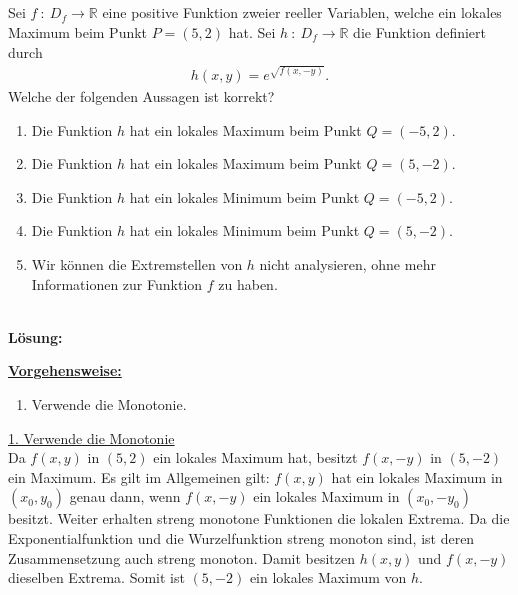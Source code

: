 \subsection*{}
Sei $ f \ : \ D_f \to \mathbb{R} $ eine positive Funktion zweier reeller Variablen, welche ein lokales Maximum beim Punkt $ P = (5,2)  $ hat.
Sei $ h  \ : \ D_f \to \mathbb{R} $ die Funktion definiert durch
\begin{align*}
	h(x,y) = e^{\sqrt{f(x,-y)}}.
\end{align*} 
Welche der folgenden Aussagen ist korrekt?
\renewcommand{\labelenumi}{(\alph{enumi})}
\begin{enumerate}
	\item Die Funktion $ h $ hat ein lokales Maximum beim Punkt $ Q = (-5,2). $
	\item Die Funktion $ h $ hat ein lokales Maximum beim Punkt $ Q = (5,-2). $
	\item Die Funktion $ h $ hat ein lokales Minimum beim Punkt $ Q = (-5,2). $
	\item Die Funktion $ h $ hat ein lokales Minimum beim Punkt $ Q = (5,-2). $
	\item Wir können die Extremstellen von $ h $ nicht analysieren, ohne mehr Informationen zur Funktion $ f $ zu haben.
\end{enumerate}
\ \\
\textbf{Lösung:}
\begin{mdframed}
	\underline{\textbf{Vorgehensweise:}}
	\renewcommand{\labelenumi}{\theenumi.}
	\begin{enumerate}
		\item Verwende die Monotonie.
	\end{enumerate}
\end{mdframed}
\underline{1. Verwende die Monotonie}\\
Da $ f(x,y) $ in  $ (5,2) $ ein lokales Maximum hat, besitzt $ f(x,-y) $ in $ (5,-2) $ ein Maximum. 
Es gilt im Allgemeinen gilt: $ f(x,y) $ hat ein lokales Maximum in $ (x_0,y_0) $ genau dann, wenn $ f(x,-y) $ ein lokales Maximum in $ (x_0,-y_0) $ besitzt.
Weiter erhalten streng monotone Funktionen die lokalen Extrema.
Da die Exponentialfunktion und die Wurzelfunktion streng monoton sind, ist deren Zusammensetzung auch streng monoton. Damit besitzen $ h(x,y) $ und $ f(x,-y) $ dieselben Extrema. Somit ist $ (5,-2) $ ein lokales Maximum von $ h$. 


\newpage
